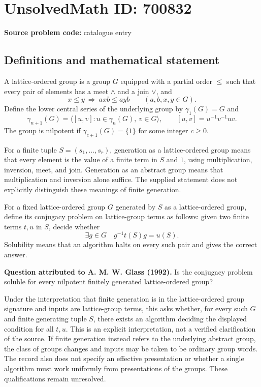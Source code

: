 \documentclass[11pt]{article}
\begin{document}
\section*{UnsolvedMath ID: 700832}
\textbf{Source problem code:} catalogue entry
\subsection{Definitions and mathematical statement}
A lattice-ordered group is a group \(G\) equipped with a partial order \(\leq\) such that every pair of elements has a meet \(\wedge\) and a join \(\vee\), and
\[
x\leq y\ \Longrightarrow\ axb\leq ayb
\qquad(a,b,x,y\in G).
\]
Define the lower central series of the underlying group by \(\gamma_1(G)=G\) and
\[
\gamma_{n+1}(G)=\langle [u,v]:u\in\gamma_n(G),\ v\in G\rangle,
\qquad [u,v]=u^{-1}v^{-1}uv.
\]
The group is nilpotent if \(\gamma_{c+1}(G)=\{1\}\) for some integer \(c\geq 0\).

For a finite tuple \(S=(s_1,\ldots,s_r)\), generation as a lattice-ordered group means that every element is the value of a finite term in \(S\) and \(1\), using multiplication, inversion, meet, and join. Generation as an abstract group means that multiplication and inversion alone suffice. The supplied statement does not explicitly distinguish these meanings of finite generation.

For a fixed lattice-ordered group \(G\) generated by \(S\) as a lattice-ordered group, define its conjugacy problem on lattice-group terms as follows: given two finite terms \(t,u\) in \(S\), decide whether
\[
\exists g\in G\quad g^{-1}t(S)g=u(S).
\]
Solubility means that an algorithm halts on every such pair and gives the correct answer.

\textbf{Question attributed to A. M. W. Glass (1992).} Is the conjugacy problem soluble for every nilpotent finitely generated lattice-ordered group?

Under the interpretation that finite generation is in the lattice-ordered group signature and inputs are lattice-group terms, this asks whether, for every such \(G\) and finite generating tuple \(S\), there exists an algorithm deciding the displayed condition for all \(t,u\). This is an explicit interpretation, not a verified clarification of the source. If finite generation instead refers to the underlying abstract group, the class of groups changes and inputs may be taken to be ordinary group words. The record also does not specify an effective presentation or whether a single algorithm must work uniformly from presentations of the groups. These qualifications remain unresolved.
\end{document}
